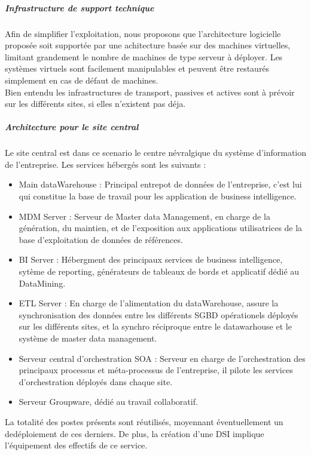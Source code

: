 \subparagraph{Infrastructure de support technique}
Afin de simplifier l'exploitation, nous proposons que l'architecture logicielle proposée soit supportée par une achitecture basée sur des machines virtuelles, limitant grandement le nombre de machines de type serveur à déployer.
Les systèmes virtuels sont facilement manipulables et peuvent être restaurés simplement en cas de défaut de machines.\\
Bien entendu les infrastructures de transport, passives et actives sont à prévoir sur les différents sites, si elles n'existent pas déja.

\subparagraph{Architecture pour le site central}

Le site central est dans ce scenario le centre névralgique du système d'information de l'entreprise. Les services hébergés sont les suivants :\\

\begin{itemize}
\item Main dataWarehouse : Principal entrepot de données de l'entreprise, c'est lui qui constitue la base de travail pour les application de business intelligence.
\item MDM Server :  Serveur de Master data Management, en charge de la génération, du maintien, et de l'exposition aux applications utilisatrices de la base d'exploitation de données de références.
\item BI Server : Hébergment des principaux services de business intelligence, sytème de reporting, générateurs de tableaux de bords et applicatif dédié au DataMining.
\item ETL Server : En charge de l'alimentation du dataWarehouse, assure la synchronisation des données entre les différents SGBD opérationels déployés sur les différents sites, et la synchro réciproque entre le datawarhouse et le système de master data management.
\item Serveur central d'orchestration SOA : Serveur en charge de l'orchestration des principaux processus et méta-processus de l'entreprise, il pilote les services d'orchestration déployés dans chaque site.
\item Serveur Groupware, dédié au travail collaboratif.
\end{itemize}

La totalité des postes présents sont réutilisés, moyennant éventuellement un dedéploiement de ces derniers. De plus, la création d'une DSI implique l'équipement des effectifs de ce service.

